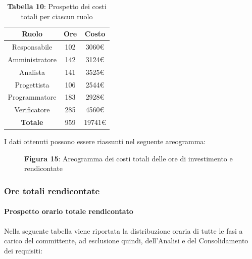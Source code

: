 \begin{table}[H]
	\centering
	\renewcommand{\arraystretch}{1.5}
	\begin{tabular}{|c|c|c|}
		\hline
		\rowcolor{lighter-grayer}
Ruolo & Ore & Costo \\ \hline
Responsabile & 102 & 3060\euro \\ \hline
Amministratore & 142 & 3124\euro \\ \hline
Analista & 141 & 3525\euro \\ \hline
Progettista & 106 & 2544\euro \\ \hline
Programmatore & 183 & 2928\euro \\ \hline
Verificatore & 285 & 4560\euro \\ \hline
\textbf{Totale} & 959 & 19741\euro \\ \hline
	\end{tabular}
	\caption*{\textbf{Tabella 10}: Prospetto dei costi totali per ciascun ruolo \\}
\end{table}

I dati ottenuti possono essere riassunti nel seguente areogramma:


\begin{figure}[H]
	\centering
	\caption*{\textbf{Figura 15}: Areogramma dei costi totali delle ore di investimento e rendicontate}
    \label{fig:Figura10}
\end{figure}

\subsubsection{Ore totali rendicontate}
\paragraph{Prospetto orario totale rendicontato}
Nella seguente tabella viene riportata la distribuzione oraria di tutte le fasi a carico del committente, ad esclusione quindi, dell'Analisi e del Consolidamento dei requisiti:


